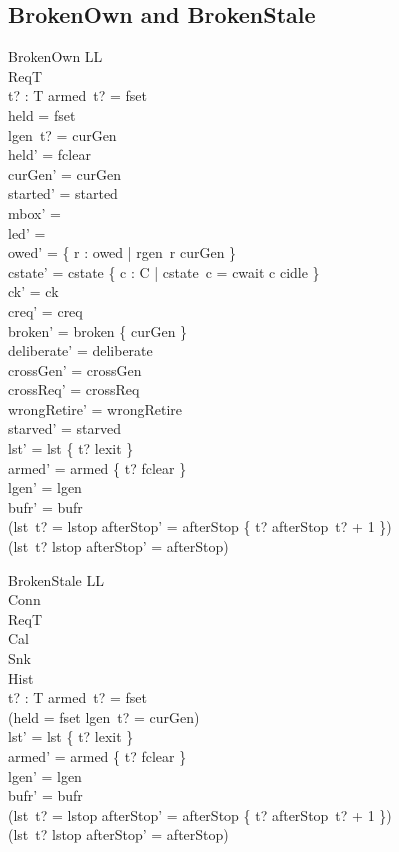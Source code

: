 \documentclass[a4paper,10pt,fleqn]{article}
\begin{document}
\subsection{BrokenOwn and BrokenStale}

\begin{schema}{BrokenOwn}
  \Delta LL \\
  \Xi ReqT \\
  t? : T
\where
  armed~t? = fset \\
  held = fset \\
  lgen~t? = curGen \\
  held' = fclear \\
  curGen' = curGen \\
  started' = started \\
  mbox' = \emptyset \\
  led' = \emptyset \\
  owed' = \{ r : owed | rgen~r \neq curGen \} \\
  cstate' = cstate \oplus \{ c : C | cstate~c = cwait \spot c \mapsto cidle \} \\
  ck' = ck \\
  creq' = creq \\
  broken' = broken \cup \{ curGen \} \\
  deliberate' = deliberate \\
  crossGen' = crossGen \\
  crossReq' = crossReq \\
  wrongRetire' = wrongRetire \\
  starved' = starved \\
  lst' = lst \oplus \{ t? \mapsto lexit \} \\
  armed' = armed \oplus \{ t? \mapsto fclear \} \\
  lgen' = lgen \\
  bufr' = bufr \\
  (lst~t? = lstop \implies
    afterStop' = afterStop \oplus \{ t? \mapsto afterStop~t? + 1 \}) \\
  (lst~t? \neq lstop \implies afterStop' = afterStop)
\end{schema}

\begin{schema}{BrokenStale}
  \Delta LL \\
  \Xi Conn \\
  \Xi ReqT \\
  \Xi Cal \\
  \Xi Snk \\
  \Xi Hist \\
  t? : T
\where
  armed~t? = fset \\
  \lnot (held = fset \land lgen~t? = curGen) \\
  lst' = lst \oplus \{ t? \mapsto lexit \} \\
  armed' = armed \oplus \{ t? \mapsto fclear \} \\
  lgen' = lgen \\
  bufr' = bufr \\
  (lst~t? = lstop \implies
    afterStop' = afterStop \oplus \{ t? \mapsto afterStop~t? + 1 \}) \\
  (lst~t? \neq lstop \implies afterStop' = afterStop)
\end{schema}
\end{document}
